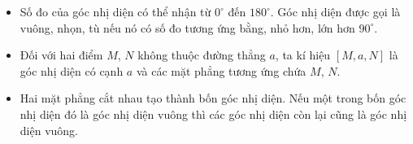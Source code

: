 \begin{tomtat}
\begin{boxdn}
{
	}	
\end{boxdn}
\begin{note}
	\begin{itemize}
	\item Số đo của góc nhị diện có thể nhận từ $0^\circ$ đến $180^\circ$. Góc nhị diện được gọi là vuông, nhọn, tù nếu nó có số đo tương ứng bằng, nhỏ hơn, lớn hơn $90^\circ$.
	\item Đối với hai điểm $M$, $N$ không thuộc đường thẳng $a$, ta kí hiệu $[M,a,N]$ là góc nhị diện có cạnh $a$ và các mặt phẳng tương ứng chứa $M$, $N$.
	\item Hai mặt phẳng cắt nhau tạo thành bốn góc nhị diện. Nếu một trong bốn góc nhị diện đó là góc nhị diện vuông thì các góc nhị diện còn lại cũng là góc nhị diện vuông.
	\end{itemize}
\end{note}
\end{tomtat}
